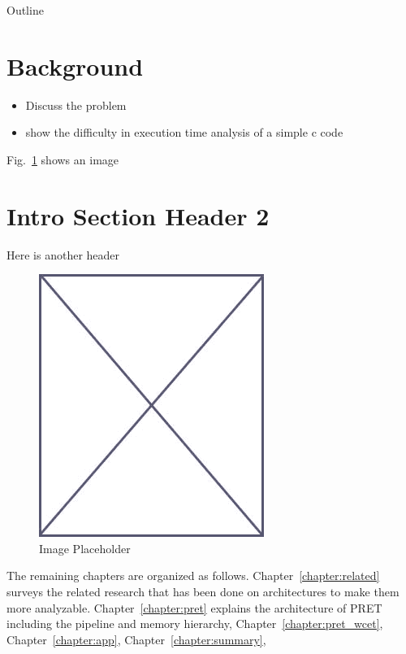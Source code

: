 Outline


\section{Background}
\label{sec:background}
\begin{itemize}
  \item Discuss the problem
  \item show the difficulty in execution time analysis of a simple c code
\end{itemize}


Fig.~\ref{fig:placeholder_intro} shows an image

\section{Intro Section Header 2}
\label{sec:intro_sec_2}

Here is another header




\label{bookmark:timing_anomalies}

\begin{figure}
\begin{center}
\vspace{-32pt}
\includegraphics[scale=.45]{figs/placeholder}
\end{center}
\vspace{-12pt}
\caption{Image Placeholder}
\label{fig:placeholder_intro}
\end{figure}

The remaining chapters are organized as follows. 
Chapter~\ref{chapter:related} surveys the related research that has been done on architectures to make them more analyzable.
Chapter~\ref{chapter:pret} explains the architecture of PRET including the \thdint pipeline and memory hierarchy, Chapter~\ref{chapter:pret_wcet}, Chapter~\ref{chapter:app}, Chapter~\ref{chapter:summary},


